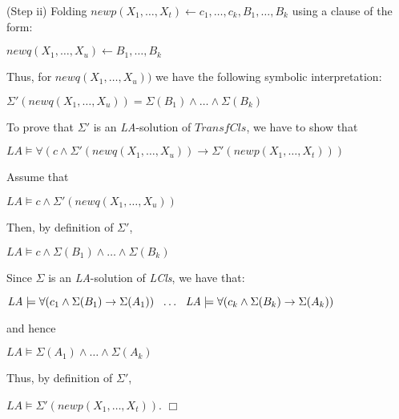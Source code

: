 \documentclass[english]{tlp}
\newcommand{\eop}{\hfill$\Box$}
\begin{document}
\noindent
(Step ii) Folding $\textit{newp}(X_1,\ldots,X_t) \leftarrow c_1, \ldots, c_k, B_1, \ldots, B_k$
using a clause of the form:

$\textit{newq}(X_1,\ldots,X_u) \leftarrow B_1, \ldots, B_k$

\noindent
Thus, for $\textit{newq}(X_1,\ldots,X_u)) $ we have the following symbolic interpretation:

$\Sigma'(\textit{newq}(X_1,\ldots,X_u)) = \Sigma(B_1) \wedge \ldots \wedge \Sigma(B_k)$

\medskip
\noindent
To prove that $\Sigma'$ is an {\it LA}-solution of $\textit{TransfCls}$, we have to show that

$\textit{LA} \models \forall (c \wedge \Sigma'(\textit{newq}(X_1,\ldots,X_u)) \rightarrow \Sigma'(\textit{newp}(X_1,\ldots,X_t)))$

\noindent
Assume that

$\textit{LA} \models c \wedge \Sigma'(\textit{newq}(X_1,\ldots,X_u)) $

\noindent
Then, by definition of $\Sigma'$,

$\textit{LA} \models c \wedge \Sigma(B_1) \wedge \ldots \wedge \Sigma(B_k) $

\noindent
Since $\Sigma$ is an {\it LA}-solution of \textit{LCls}, we have that:

${\it LA} \models \forall (c_1 \wedge \Sigma(B_1) \rightarrow \Sigma(A_1))  \ \ \ldots \ \  \textit{LA} \models \forall (c_k \wedge \Sigma(B_k) \rightarrow \Sigma(A_k)) $

\noindent
and hence

$\textit{LA} \models \Sigma(A_1) \wedge \ldots \wedge \Sigma(A_k) $

\noindent
Thus, by definition of $\Sigma'$,

$\textit{LA} \models \Sigma'(\textit{newp}(X_1,\ldots,X_t)).
$ \hfill \eop
\end{document}
